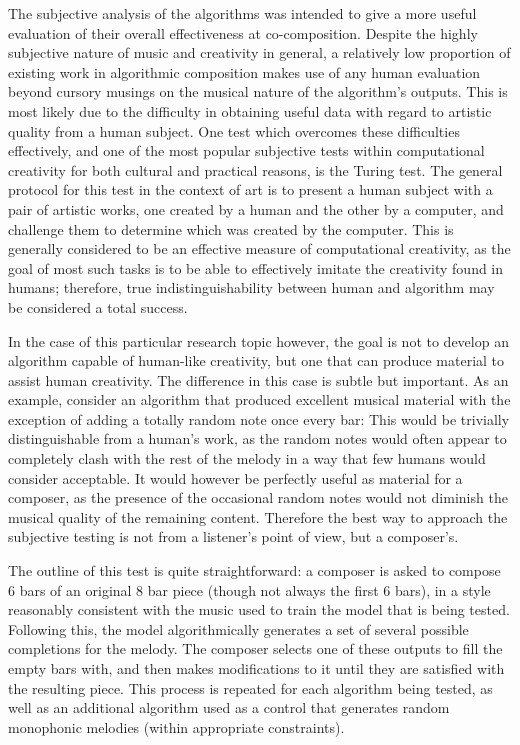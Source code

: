 \documentclass[ author={Stephen Livermore-Tozer},
				supervisor={Dr. Peter Flach},
				degree={MEng},
				title={Algorithmic Co-composition Using Machine Learning},
				subtitle={},
				type={research},
				year={2016} ]{dissertation}
\begin{document}
	The subjective analysis of the algorithms was intended to give a more useful evaluation of their overall effectiveness at co-composition. Despite the highly subjective nature of music and creativity in general, a relatively low proportion of existing work in algorithmic composition makes use of any human evaluation beyond cursory musings on the musical nature of the algorithm's outputs. This is most likely due to the difficulty in obtaining useful data with regard to artistic quality from a human subject. One test which overcomes these difficulties effectively, and one of the most popular subjective tests within computational creativity for both cultural and practical reasons, is the Turing test. The general protocol for this test in the context of art is to present a human subject with a pair of artistic works, one created by a human and the other by a computer, and challenge them to determine which was created by the computer. This is generally considered to be an effective measure of computational creativity, as the goal of most such tasks is to be able to effectively imitate the creativity found in humans; therefore, true indistinguishability between human and algorithm may be considered a total success.
	
	In the case of this particular research topic however, the goal is not to develop an algorithm capable of human-like creativity, but one that can produce material to assist human creativity. The difference in this case is subtle but important. As an example, consider an algorithm that produced excellent musical material with the exception of adding a totally random note once every bar: This would be trivially distinguishable from a human's work, as the random notes would often appear to completely clash with the rest of the melody in a way that few humans would consider acceptable. It would however be perfectly useful as material for a composer, as the presence of the occasional random notes would not diminish the musical quality of the remaining content. Therefore the best way to approach the subjective testing is not from a listener's point of view, but a composer's.
	
	The outline of this test is quite straightforward: a composer is asked to compose 6 bars of an original 8 bar piece (though not always the first 6 bars), in a style reasonably consistent with the music used to train the model that is being tested. Following this, the model algorithmically generates a set of several possible completions for the melody. The composer selects one of these outputs to fill the empty bars with, and then makes modifications to it until they are satisfied with the resulting piece. This process is repeated for each algorithm being tested, as well as an additional algorithm used as a control that generates random monophonic melodies (within appropriate constraints).
	
\end{document}
